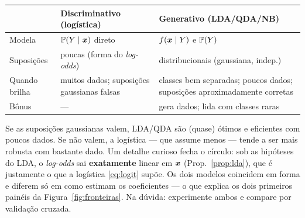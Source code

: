 \documentclass[11pt,a4paper]{article}
\begin{document}
\begin{center}\small
\renewcommand{\arraystretch}{1.3}
\begin{tabular}{@{}p{3.2cm}p{5.4cm}p{5.4cm}@{}}
\toprule
 & \textbf{Discriminativo (logística)} & \textbf{Generativo (LDA/QDA/NB)} \\
\midrule
Modela & $\mathbb{P}(Y\mid\bm{x})$ direto & $f(\bm{x}\mid Y)$ e $\mathbb{P}(Y)$ \\
Suposições & poucas (forma do \emph{log-odds}) & distribucionais (gaussiana, indep.) \\
Quando brilha & muitos dados; suposições gaussianas falsas & classes bem separadas; poucos dados; suposições aproximadamente corretas \\
Bônus & --- & gera dados; lida com classes raras \\
\bottomrule
\end{tabular}
\end{center}

\begin{ideia}
Se as suposições gaussianas valem, LDA/QDA são (quase) ótimos e eficientes com
poucos dados. Se não valem, a logística --- que assume menos --- tende a ser mais
robusta com bastante dado. Um detalhe curioso fecha o círculo: sob as hipóteses do
LDA, o \emph{log-odds} sai \textbf{exatamente} linear em $\bm{x}$
(Prop.~\ref{prop:lda}), que é justamente o que a logística \eqref{eq:logit} supõe.
Os dois modelos coincidem em forma e diferem só em como estimam os coeficientes ---
o que explica os dois primeiros painéis da Figura~\ref{fig:fronteiras}. Na dúvida:
experimente ambos e compare por validação cruzada.
\end{ideia}

\end{document}
